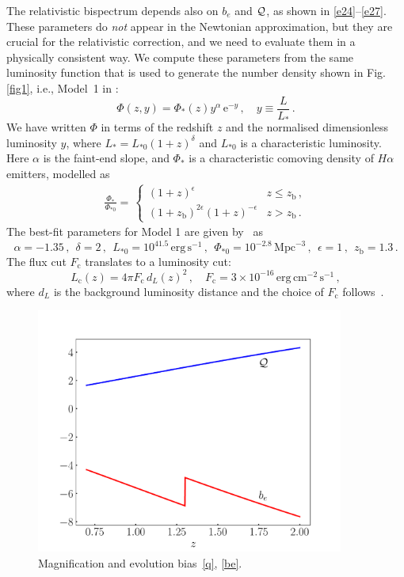 The relativistic bispectrum depends  also on $b_e$  and ${\cal Q}$, as shown in \eqref{e24}--\eqref{e27}.
These parameters do {\em not} appear in the Newtonian approximation, but they are crucial for the relativistic correction, and we need to evaluate them in a physically consistent way. We compute these parameters from the same luminosity function that is  used to generate the number density shown in Fig. \ref{fig1}, i.e., Model~1 in \cite{Pozzetti:2016cch}:
\begin{equation}
\Phi( z,y) = \Phi_{*}(z) y^\alpha\,{\mathrm{e}}^{-y}\,, \quad y\equiv \frac{L}{L_{*}}\,.
\label{e12_3}
\end{equation}
We have written $\Phi$ in terms of the redshift $z$ and the normalised dimensionless luminosity $y$, where $L_*=L_{*0}(1+z)^\delta$ and $L_{*0}$ is a characteristic luminosity. Here $\alpha$ is the faint-end slope, and $\Phi_{*}$ is a characteristic comoving density of $H\alpha$ emitters, modelled as 
\begin{align}
\frac{\Phi_{*}}{\Phi_{*0}}= \,
\begin{cases} (1+z)^{\epsilon} &   z \leq z_{\mathrm{b}}\,,\\
(1+z_{\mathrm{b}})^{2\epsilon}(1+z)^{-\epsilon} & z > z_{\mathrm{b}} \,.
\end{cases}
\end{align}
The best-fit parameters for Model 1 are given by~\cite{Pozzetti:2016cch} as 
\begin{equation} \label{eucp}
\alpha=-1.35\,, ~~\delta=2\,,~~ L_{*0}=10^{41.5}\,\mathrm{erg\,s}^{-1}\,,~~\Phi_{*0}=10^{-2.8}\,\mathrm{Mpc}^{-3}\,,~~\epsilon=1\,,~~z_{\mathrm{b}}=1.3  \,. 
\end{equation}
The flux cut $F_{\mathrm{c}}$ translates to a luminosity cut:
 \begin{equation} \label{lc}
 L_{\mathrm{c}}(z)=4\pi F_{\mathrm{c}} \,d_L(z)^2\,,\quad F_{\mathrm{c}} =3\times10^{-16}\,\mathrm{erg\,cm^{-2}\,s^{-1}} \,,
 \end{equation}
where $d_L$ is the background luminosity distance and the choice of $F_{\mathrm{c}}$ follows~\cite{Yankelevich:2018uaz}. 
\begin{figure}[!ht]
\centering
\includegraphics[width=0.9\textwidth]{fig/beQ-eps-converted-to}
\caption{Magnification and evolution bias~\eqref{q}, \eqref{be}.} 
\label{fig2}
\end{figure}

